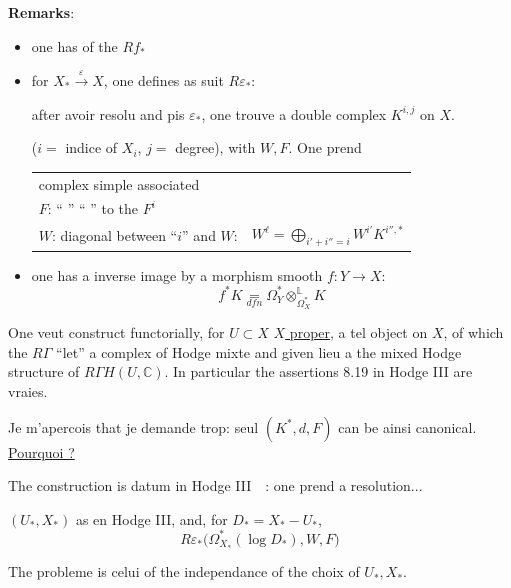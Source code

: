 \documentclass[11pt,a4paper]{article}
\begin{document}
\noindent \textbf{Remarks}:
\begin{itemize}[leftmargin=2cm]
    \item[a)] one has of the $Rf_{*}$
    \item[b)] for $X_{*} \xrightarrow{\varepsilon} X$, one defines as suit $R\varepsilon_{*}$:
    
    after avoir resolu and pis $\varepsilon_{*}$, one trouve a double complex $K^{i,j}$ on $X$.
    
    ($i =$ indice of $X_{i}$, $j =$ degree), with $W, F$. One prend
    \begin{center}
    \begin{tabular}{ll}
    complex simple associated & \\
    $F$: `` '' `` '' to the $F^{i}$ & \\
    $W$: diagonal between ``$i$'' and $W$: & $W^{\ell} = \bigoplus\limits_{i'+i''=i} W^{i'} K^{i'',*}$
    \end{tabular}
    \end{center}
    \item[c)] one has a inverse image by a morphism smooth $f : Y \to X$:
    \[
    f^{*} K \underset{dfn}{=} \Omega_{Y}^{*} \otimes_{\Omega_{X}^{*}}^{\mathbb{L}} K
    \]
\end{itemize}

\vspace{0.3cm}

One veut construct functorially, for $U \subset X$ \underline{$X$ proper}, a tel object on $X$, of which the $R\Gamma$ ``let'' a complex of Hodge mixte and given lieu a the mixed Hodge structure of $R\Gamma H(U, \mathbb{C})$. In particular the assertions 8.19 in Hodge III are vraies.

\vspace{0.3cm}

Je m'apercois that je demande trop: seul $(K^{*}, d, F)$ can be ainsi canonical. \underline{Pourquoi ?}

\newpage

The construction is datum in Hodge III \,\, : one prend a resolution...

$(U_{*}, X_{*})$ as en Hodge III, and, for $D_{*} = X_{*} - U_{*}$,
\[
R\varepsilon_{*}\bigl(\Omega_{X_{*}}^{*}(\log D_{*}), W, F\bigr)
\]

The probleme is celui of the independance of the choix of $U_{*}, X_{*}$.

\vspace{0.3cm}
\end{document}
